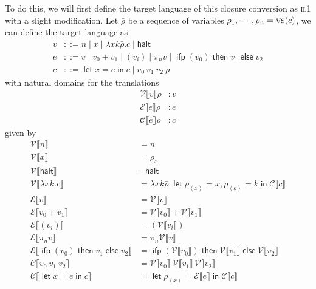 \documentclass[11pt,a4paper]{article}
\newcommand {\coo} [1] {\ensuremath{\operatorname{\mathsf{#1}}}}
\newcommand {\co} [1] {\coo{#1}}
\newcommand {\Ifp}[3] {\co{ifp} (#1) \co{then} #2 \co{else} #3}
\newcommand{\Let}[1]{\coo{let} #1 \coo{in} }
\newcommand{\pa}[1]{\left(#1\right)}
\newcommand{\ba}[1]{\left\langle #1\right\rangle}
\newcommand{\f}[1]{\textsc{#1}}
\newcommand{\g}[1]{\textsf{#1}}
\newcommand{\trans}[2]{\ensuremath{\mathcal{#1}\llbracket #2\rrbracket}}
\begin{document}
\begin{enumerate}[label=\textbf{Excercise \arabic*\ }]
\begin{enumerate}
To do this, we will first define the target language of this closure conversion as \f{il1} with a slight modification. Let $\bar\rho$ be a sequence of variables $\rho_1, \cdots, \rho_n = \f{vs}(c)$, we can define the target language as
\begin{align*}
v &::= n \mid x \mid \lambda xk\bar\rho.c \mid \g{halt} \\
e &::= v \mid v_0 + v_1 \mid (v_i) \mid \pi_n v \mid \Ifp{v_0}{v_1}{v_2} \\
c &::= \Let{x = e}{c} \mid v_0~v_1~v_2~\bar\rho
\end{align*}
with natural domains for the translations
\begin{align*}
\trans{V}{v} \rho &: v \\
\trans{E}{e} \rho &: e \\
\trans{C}{e} \rho &: c
\end{align*}
given by
\begin{align*}
\trans{V}{n} &= n \\
\trans{V}{x} &= \rho_{x} \\
\trans{V}{\g{halt}} &= \g{halt} \\
\trans{V}{\lambda xk.c} &= \lambda xk\bar\rho. \Let{\rho_{\ba{x}} = x, \rho_{\ba{k}} = k}{\trans{C}{c}} \\
\trans{E}{v} &= \trans{V}{v} \\
\trans{E}{v_0 + v_1} &= \trans{V}{v_0} + \trans{V}{v_1} \\
\trans{E}{(v_i)} &= \pa{\trans{V}{v_i}} \\
\trans{E}{\pi_n v} &= \pi_n \trans{V}{v} \\
\trans{E}{\Ifp{v_0}{v_1}{v_2}} &= \Ifp{\trans{V}{v_0}}{\trans{V}{v_1}}{\trans{V}{v_2}} \\
\trans{C}{v_0~v_1~v_2} &= \trans{V}{v_0}~\trans{V}{v_1}~\trans{V}{v_2} \\
\trans{C}{\Let{x = e}{c}} &= \Let{\rho_{\ba{x}} = \trans{E}{e}}{\trans{C}{c}}
\end{align*}


\end{enumerate}
\end{enumerate}
\end{document}
